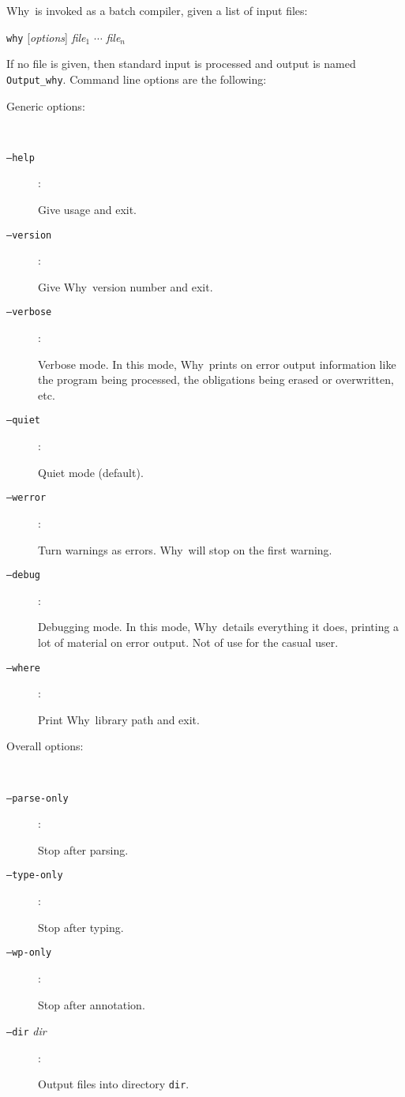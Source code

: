\documentclass[a4paper,12pt]{report}
\newcommand{\why}{\textsf{Why}}
\begin{document}
\why\ is invoked as a batch compiler, given a list of input files:
\begin{center}
  \texttt{why} [\textit{options}] \textit{file}$_1$ $\cdots$ \textit{file}$_n$
\end{center}
If no file is given, then standard input is processed and output is
named \texttt{Output\_why}.
Command line options are the following:
\begin{description}
  \item[Generic options:] ~\par
  \item[\texttt{--help}]: ~\par    
    Give usage and exit. 
  \item[\texttt{--version}]: ~\par    
    Give \why\ version number and exit. 
  \item[\texttt{--verbose}]: ~\par 
    Verbose mode. In this mode, \why\ prints on error output
    information like the program being processed, the obligations
    being erased or overwritten, etc.
  \item[\texttt{--quiet}]: ~\par  
    Quiet mode (default).
  \item[\texttt{--werror}]: ~\par 
    Turn warnings as errors. \why\ will stop on the first warning.
  \item[\texttt{--debug}]: ~\par 
    Debugging mode. In this mode, \why\ details everything it does,
    printing a lot of material on error output. Not of use for the
    casual user.
  \item[\texttt{--where}]: ~\par 
    Print \why\ library path and exit.

  \item[Overall options:] ~\par
  \item[\texttt{--parse-only}]: ~\par  
    Stop after parsing.
  \item[\texttt{--type-only}]:  ~\par  
    Stop after typing.
  \item[\texttt{--wp-only}]:    ~\par  
    Stop after annotation.
  \item[\texttt{--dir} \textit{dir}]: ~\par
    Output files into directory \texttt{dir}.


\end{description}
\end{document}
